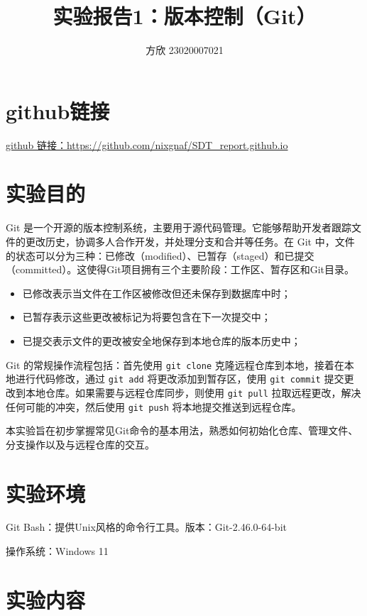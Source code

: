 \documentclass{article}
\title{实验报告1：版本控制（Git）}
\author{方欣 23020007021}
\date{}
\begin{document}
\maketitle

\tableofcontents
\thispagestyle{empty}			

\newpage
\section{github链接}
\href{https://github.com/nixgnaf/SDT_report.github.io}{github 链接：https://github.com/nixgnaf/SDT_report.github.io}

\section{实验目的}
Git 是一个开源的版本控制系统，主要用于源代码管理。它能够帮助开发者跟踪文件的更改历史，协调多人合作开发，并处理分支和合并等任务。在 Git 中，文件的状态可以分为三种：已修改（modified）、已暂存（staged）和已提交（committed）。这使得Git项目拥有三个主要阶段：工作区、暂存区和Git目录。
\begin{itemize}
    \item 已修改表示当文件在工作区被修改但还未保存到数据库中时；
    \item 已暂存表示这些更改被标记为将要包含在下一次提交中；
    \item 已提交表示文件的更改被安全地保存到本地仓库的版本历史中；
\end{itemize}
Git 的常规操作流程包括：首先使用 \texttt{git clone} 克隆远程仓库到本地，接着在本地进行代码修改，通过 \texttt{git add} 将更改添加到暂存区，使用 \texttt{git commit} 提交更改到本地仓库。如果需要与远程仓库同步，则使用 \texttt{git pull} 拉取远程更改，解决任何可能的冲突，然后使用 \texttt{git push} 将本地提交推送到远程仓库。

本实验旨在初步掌握常见Git命令的基本用法，熟悉如何初始化仓库、管理文件、分支操作以及与远程仓库的交互。

\section{实验环境}
Git Bash：提供Unix风格的命令行工具。版本：Git-2.46.0-64-bit

操作系统：Windows 11

\section{实验内容}
\end{document}
